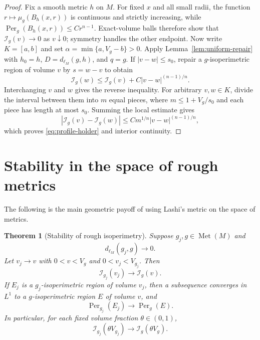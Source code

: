 \documentclass[11pt]{amsart}
\newtheorem{theorem}{Theorem}[section]
\theoremstyle{definition}
\theoremstyle{remark}
\newcommand{\Met}{\operatorname{Met}}
\newcommand{\dMet}{d_{\ell_M}}
\newcommand{\Per}{\operatorname{Per}}
\newcommand{\cI}{\mathcal I}
\begin{document}
\begin{proof}
Fix a smooth metric $h$ on $M$.
For fixed $x$ and all small radii, the function
$r\mapsto\mu_g(B_h(x,r))$ is continuous and strictly increasing, while
$\Per_g(B_h(x,r))\leq Cr^{n-1}$.  Exact-volume balls therefore show that
$\cI_g(v)\to0$ as $v\downarrow0$; symmetry handles the other endpoint.  Now
write $K=[a,b]$ and set $\alpha=\min\{a,V_g-b\}>0$.  Apply
Lemma~\ref{lem:uniform-repair} with $h_0=h$, $D=\dMet(g,h)$, and $q=g$.
If $|v-w|\leq s_0$, repair a
$g$-isoperimetric region of volume $v$ by $s=w-v$ to obtain
\[
 \cI_g(w)\leq\cI_g(v)+C|v-w|^{(n-1)/n}.
\]
Interchanging $v$ and $w$ gives the reverse inequality.  For arbitrary
$v,w\in K$, divide the interval between them into $m$ equal pieces, where
$m\leq1+V_g/s_0$ and each piece has length at most $s_0$.  Summing the local
estimate gives
\[
 |\cI_g(v)-\cI_g(w)|
 \leq C m^{1/n}|v-w|^{(n-1)/n},
\]
which proves \eqref{eq:profile-holder} and interior continuity.
\end{proof}

\section{Stability in the space of rough metrics}

The following is the main geometric payoff of using Lashi's metric on the
space of metrics.

\begin{theorem}[Stability of rough isoperimetry]
\label{thm:profile-stability}
Suppose $g_j,g\in\Met(M)$ and
\[
 \dMet(g_j,g)\longrightarrow0.
\]
Let $v_j\to v$ with $0<v<V_g$ and $0<v_j<V_{g_j}$.  Then
\begin{equation}\label{eq:profile-convergence}
 \cI_{g_j}(v_j)\longrightarrow\cI_g(v).
\end{equation}
If $E_j$ is a $g_j$-isoperimetric region of volume $v_j$, then a subsequence
converges in $L^1$ to a $g$-isoperimetric region $E$ of volume $v$, and
\begin{equation}\label{eq:minimiser-perimeter-convergence}
 \Per_{g_j}(E_j)\longrightarrow\Per_g(E).
\end{equation}
In particular, for each fixed volume fraction $\theta\in(0,1)$,
\[
 \cI_{g_j}(\theta V_{g_j})\longrightarrow\cI_g(\theta V_g).
\]
\end{theorem}
\end{document}
